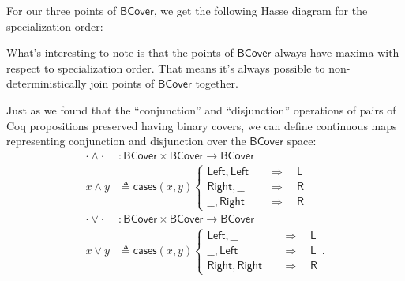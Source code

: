 \documentclass[conference]{IEEEtran}
\newcommand{\Branch}{\Rightarrow}
\begin{document}
For our three points of $\mathsf{BCover}$, we get the following Hasse diagram for the specialization order:
\begin{center}
\end{center}

What's interesting to note is that the points of $\mathsf{BCover}$ always have maxima with respect to specialization order. That means it's always possible to non-deterministically join points of $\mathsf{BCover}$ together.

Just as we found that the ``conjunction'' and ``disjunction'' operations of pairs of Coq propositions preserved having binary covers, we can define continuous maps representing conjunction and disjunction over the $\mathsf{BCover}$ space:
\begin{align*}
\cdot \wedge \cdot &: \mathsf{BCover} \times \mathsf{BCover} \to \mathsf{BCover}
\\ x \wedge y &\triangleq \mathsf{cases}(x, y)
\begin{cases}
\mathsf{Left}, \mathsf{Left}
 \quad &\Branch \quad
 \mathsf{L}
\\
\mathsf{Right}, \_\_
 \quad &\Branch \quad
 \mathsf{R}
\\
\_\_, \mathsf{Right}
 \quad &\Branch \quad
 \mathsf{R}
\end{cases}
\\
\cdot \vee \cdot &: \mathsf{BCover} \times \mathsf{BCover} \to \mathsf{BCover}
\\ x \vee y &\triangleq \mathsf{cases}(x, y)
\begin{cases}
\mathsf{Left}, \_\_
 \quad &\Branch \quad
 \mathsf{L}
\\
\_\_, \mathsf{Left}
 \quad &\Branch \quad
 \mathsf{L}
\\
 \mathsf{Right}, \mathsf{Right}
 \quad &\Branch \quad
 \mathsf{R}
\end{cases}.
\end{align*}
\end{document}
